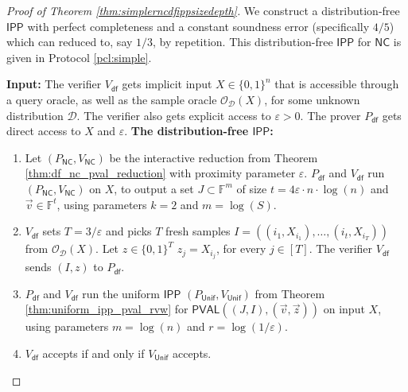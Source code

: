 \documentclass[10pt,a4paper]{article}
\makeatletter
\newcommand{\NC}{\mathsf{NC}}
\newcommand{\PVAL}{\mathsf{PVAL}}
\newcommand{\IPP}{\mathsf{IPP}}
\newcommand{\F}{\mathbb{F}}
\newcommand{\sD}{\mathcal{D}}
\newcommand{\sO}{\mathcal{O}}
\newcommand{\eps}{\varepsilon}
\newenvironment{protocol}[1][htb]{
    \renewcommand{\ALG@name}{Protocol}
    \begin{algorithm}[#1]
    }{\end{algorithm}
}
\makeatother
\begin{document}
\begin{proof}[Proof of Theorem \ref{thm:simplerncdfippsizedepth}]
We construct a distribution-free $\IPP$ with perfect completeness and a constant soundness error (specifically $4/5$) which can reduced to, say $1/3$, by repetition. This distribution-free $\IPP$ for $\NC$ is given in Protocol \ref{pcl:simple}. 
\begin{protocol}[h!]
\caption{Distribution-free $\IPP$ for any language $L$ computable by circuits of size $S(n)$ and depth $\Delta_{L}(n)$.}
\label{pcl:simple}
\begin{algorithmic}{}
\vspace{0.1in}
\STATE \textbf{Input:} The verifier $V_{\mathsf{df}}$ gets implicit input $X\in \{0,1\}^{n}$ that is accessible through a query oracle, as well as the sample oracle $\sO_\sD(X)$, for some unknown distribution $\sD$. The verifier also gets explicit access to $\varepsilon > 0$. The prover $P_{\mathsf{df}}$ gets direct access to $X$ and $\varepsilon$.
\vspace{0.1in}
\STATE \textbf{The distribution-free $\IPP$:}

    \begin{enumerate}
    \item Let $(P_{\NC}, V_{\NC})$ be the interactive reduction from Theorem \ref{thm:df_nc_pval_reduction} with proximity parameter $\eps$. $P_{\mathsf{df}}$ and $V_{\mathsf{df}}$ run $(P_{\NC},V_{\NC})$ on $X$, to output a set $J \subset \F^m$ of size $t=4\varepsilon\cdot n\cdot\log (n)$ and $\Vec{v}\in \F^{t}$, using parameters $k = 2$ and $m = \log(S)$.
            
    \item \label{step:dfNCsimplesamples} $V_{\mathsf{df}}$ sets $T= 3/\varepsilon$ and picks $T$ fresh samples $I=((i_{1},X_{i_1}), \dots, (i_{t},X_{i_T}))$ from $\sO_\sD(X)$. Let $z\in \{0,1\}^{T}$ $z_{j}=X_{i_{j}}$, for every $j \in [T]$.
    The verifier    $V_{\mathsf{df}}$ sends $(I,z)$ to $P_{\mathsf{df}}$.

    \item \label{step:IPP_unif}$P_{\mathsf{df}}$ and $V_{\mathsf{df}}$ run the uniform $\IPP$ $(P_{\mathsf{Unif}}, V_{\mathsf{Unif}})$ from Theorem \ref{thm:uniform_ipp_pval_rvw} for $\PVAL((J, I), (\Vec{v},\Vec{z}))$ on input $X$, using parameters $m=\log (n)$ and $r=\log(1/\varepsilon)$.
    
    \item $V_\mathsf{df}$ accepts if and only if $V_\mathsf{Unif}$ accepts.
    \end{enumerate}
\item
\end{algorithmic}
\end{protocol}


\end{proof}
\end{document}
